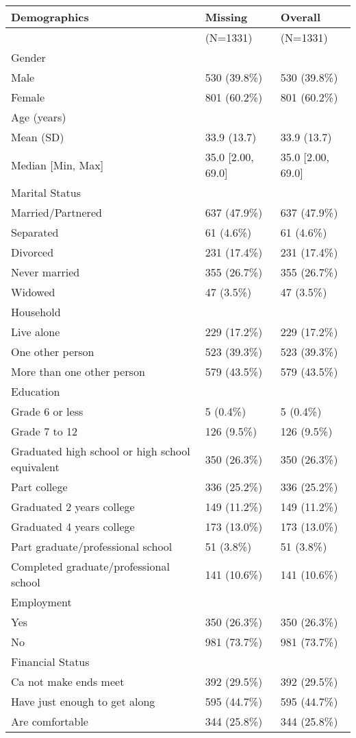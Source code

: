 \documentclass[border=1mm]{standalone}
\begin{document}
\begin{table}
\centering
\begin{tabular}{l|l|l}
\hline
Demographics & Missing & Overall\\
\hline
 & (N=1331) & (N=1331)\\
\hline
Gender &  & \\
\hline
Male & 530 (39.8\%) & 530 (39.8\%)\\
\hline
Female & 801 (60.2\%) & 801 (60.2\%)\\
\hline
Age (years) &  & \\
\hline
Mean (SD) & 33.9 (13.7) & 33.9 (13.7)\\
\hline
Median [Min, Max] & 35.0 [2.00, 69.0] & 35.0 [2.00, 69.0]\\
\hline
Marital Status &  & \\
\hline
Married/Partnered & 637 (47.9\%) & 637 (47.9\%)\\
\hline
Separated & 61 (4.6\%) & 61 (4.6\%)\\
\hline
Divorced & 231 (17.4\%) & 231 (17.4\%)\\
\hline
Never married & 355 (26.7\%) & 355 (26.7\%)\\
\hline
Widowed & 47 (3.5\%) & 47 (3.5\%)\\
\hline
Household &  & \\
\hline
Live alone & 229 (17.2\%) & 229 (17.2\%)\\
\hline
One other person & 523 (39.3\%) & 523 (39.3\%)\\
\hline
More than one other person & 579 (43.5\%) & 579 (43.5\%)\\
\hline
Education &  & \\
\hline
Grade 6 or less & 5 (0.4\%) & 5 (0.4\%)\\
\hline
Grade 7 to 12 & 126 (9.5\%) & 126 (9.5\%)\\
\hline
Graduated high school or high school equivalent & 350 (26.3\%) & 350 (26.3\%)\\
\hline
Part college & 336 (25.2\%) & 336 (25.2\%)\\
\hline
Graduated 2 years college & 149 (11.2\%) & 149 (11.2\%)\\
\hline
Graduated 4 years college & 173 (13.0\%) & 173 (13.0\%)\\
\hline
Part graduate/professional school & 51 (3.8\%) & 51 (3.8\%)\\
\hline
Completed graduate/professional school & 141 (10.6\%) & 141 (10.6\%)\\
\hline
Employment &  & \\
\hline
Yes & 350 (26.3\%) & 350 (26.3\%)\\
\hline
No & 981 (73.7\%) & 981 (73.7\%)\\
\hline
Financial Status &  & \\
\hline
Ca not make ends meet & 392 (29.5\%) & 392 (29.5\%)\\
\hline
Have just enough to get along & 595 (44.7\%) & 595 (44.7\%)\\
\hline
Are comfortable & 344 (25.8\%) & 344 (25.8\%)\\
\hline
\end{tabular}
\end{table}
\end{document}
